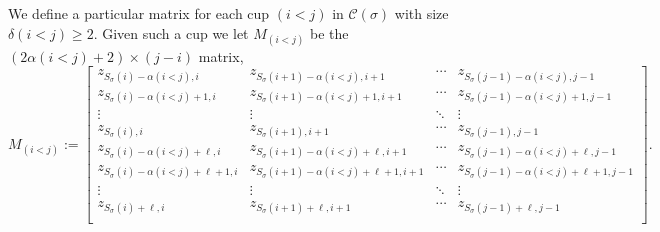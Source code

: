 \documentclass[11pt]{amsart}
\theoremstyle{remark}
\theoremstyle{remark}
\theoremstyle{definition}
\theoremstyle{definition}
\theoremstyle{definition}
\numberwithin{equation}{section}
\newcommand{\gd}{\delta}
\newcommand{\gs}{\sigma}
\newcommand{\cc}{\mathcal{C}}
\newcommand{\al}{\alpha}
\newcommand{\cupsigma}{\cc(\gs)}
\begin{document}
We define a particular matrix for each cup $(i<j)$ in $\cupsigma$ with size $\gd(i<j)\geq 2$.  Given such a cup we let $M_{(i<j)}$ be the $(2\al(i<j)+2)\times (j-i)$ matrix,
\begin{equation}\label{eqn.matrix}
M_{(i<j)}:=  \begin{bmatrix}
    z_{S_\gs(i)-\al(i<j),i} & z_{S_\gs(i+1)-\al(i<j),i+1}& \cdots & z_{S_\gs(j-1)-\al(i<j),j-1}\\
    z_{S_\gs(i)-\al(i<j)+1,i}& z_{S_\gs(i+1)-\al(i<j)+1,i+1} & \cdots &z_{S_\gs(j-1)-\al(i<j)+1,j-1}\\
    \vdots & \vdots &\ddots& \vdots\\
    z_{S_\gs(i),i} & z_{S_\gs(i+1),i+1}& \cdots & z_{S_\gs(j-1),j-1}\\
z_{S_\gs(i)-\al(i<j)+\ell,i} & z_{S_\gs(i+1)-\al(i<j)+\ell,i+1}& \cdots & z_{S_\gs(j-1)-\al(i<j)+\ell,j-1}\\
    z_{S_\gs(i)-\al(i<j)+\ell+1,i}& z_{S_\gs(i+1)-\al(i<j)+\ell+1,i+1} & \cdots &z_{S_\gs(j-1)-\al(i<j)+\ell+1,j-1}\\
    \vdots & \vdots &\ddots& \vdots\\
    z_{S_\gs(i)+\ell,i} & z_{S_\gs(i+1)+\ell,i+1}& \cdots & z_{S_\gs(j-1)+\ell,j-1}\\
\end{bmatrix}.
\end{equation}
\end{document}
